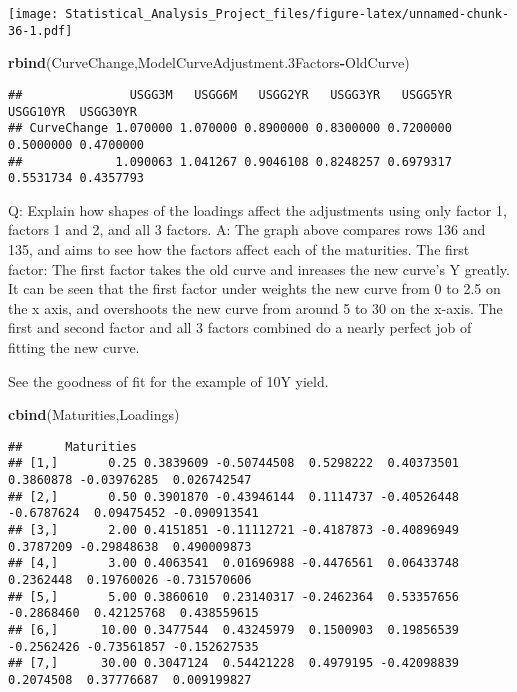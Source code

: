\documentclass[]{article}
\newenvironment{Shaded}{\begin{snugshade}}{\end{snugshade}}
\newcommand{\KeywordTok}[1]{\textcolor[rgb]{0.13,0.29,0.53}{\textbf{#1}}}
\newcommand{\OperatorTok}[1]{\textcolor[rgb]{0.81,0.36,0.00}{\textbf{#1}}}
\newcommand{\NormalTok}[1]{#1}
\begin{document}
\texttt{[image: Statistical\_Analysis\_Project\_files/figure-latex/unnamed-chunk-36-1.pdf]}

\begin{Shaded}
\begin{Highlighting}[]
\KeywordTok{rbind}\NormalTok{(CurveChange,ModelCurveAdjustment.3Factors}\OperatorTok{-}\NormalTok{OldCurve)}
\end{Highlighting}
\end{Shaded}

\begin{verbatim}
##               USGG3M   USGG6M   USGG2YR   USGG3YR   USGG5YR  USGG10YR  USGG30YR
## CurveChange 1.070000 1.070000 0.8900000 0.8300000 0.7200000 0.5000000 0.4700000
##             1.090063 1.041267 0.9046108 0.8248257 0.6979317 0.5531734 0.4357793
\end{verbatim}

Q: Explain how shapes of the loadings affect the adjustments using only
factor 1, factors 1 and 2, and all 3 factors. A: The graph above
compares rows 136 and 135, and aims to see how the factors affect each
of the maturities. The first factor: The first factor takes the old
curve and inreases the new curve's Y greatly. It can be seen that the
first factor under weights the new curve from 0 to 2.5 on the x axis,
and overshoots the new curve from around 5 to 30 on the x-axis. The
first and second factor and all 3 factors combined do a nearly perfect
job of fitting the new curve.

See the goodness of fit for the example of 10Y yield.

\begin{Shaded}
\begin{Highlighting}[]
\KeywordTok{cbind}\NormalTok{(Maturities,Loadings)}
\end{Highlighting}
\end{Shaded}

\begin{verbatim}
##      Maturities                                                                                 
## [1,]       0.25 0.3839609 -0.50744508  0.5298222  0.40373501  0.3860878 -0.03976285  0.026742547
## [2,]       0.50 0.3901870 -0.43946144  0.1114737 -0.40526448 -0.6787624  0.09475452 -0.090913541
## [3,]       2.00 0.4151851 -0.11112721 -0.4187873 -0.40896949  0.3787209 -0.29848638  0.490009873
## [4,]       3.00 0.4063541  0.01696988 -0.4476561  0.06433748  0.2362448  0.19760026 -0.731570606
## [5,]       5.00 0.3860610  0.23140317 -0.2462364  0.53357656 -0.2868460  0.42125768  0.438559615
## [6,]      10.00 0.3477544  0.43245979  0.1500903  0.19856539 -0.2562426 -0.73561857 -0.152627535
## [7,]      30.00 0.3047124  0.54421228  0.4979195 -0.42098839  0.2074508  0.37776687  0.009199827
\end{verbatim}
\end{document}
